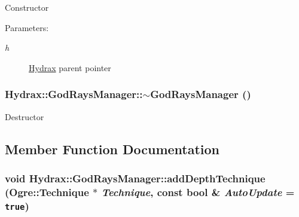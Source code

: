 \begin{CompactItemize}
Constructor \begin{Desc}
\item[Parameters:]
\begin{description}
\item[{\em h}]\hyperlink{class_hydrax_1_1_hydrax}{Hydrax} parent pointer \end{description}
\end{Desc}
\hypertarget{class_hydrax_1_1_god_rays_manager_6c76b08ac42e38a3621eac4f71d7f3ae}{
\subsubsection[{$\sim$GodRaysManager}]{\setlength{\rightskip}{0pt plus 5cm}Hydrax::GodRaysManager::$\sim$GodRaysManager ()}}
\label{class_hydrax_1_1_god_rays_manager_6c76b08ac42e38a3621eac4f71d7f3ae}


Destructor 

\subsection{Member Function Documentation}
\hypertarget{class_hydrax_1_1_god_rays_manager_be86da8a21691f1bac9d817147c9edba}{
\subsubsection[{addDepthTechnique}]{\setlength{\rightskip}{0pt plus 5cm}void Hydrax::GodRaysManager::addDepthTechnique (Ogre::Technique $\ast$ {\em Technique}, \/  const bool \& {\em AutoUpdate} = {\tt true})}}
\label{class_hydrax_1_1_god_rays_manager_be86da8a21691f1bac9d817147c9edba}



\end{CompactItemize}
